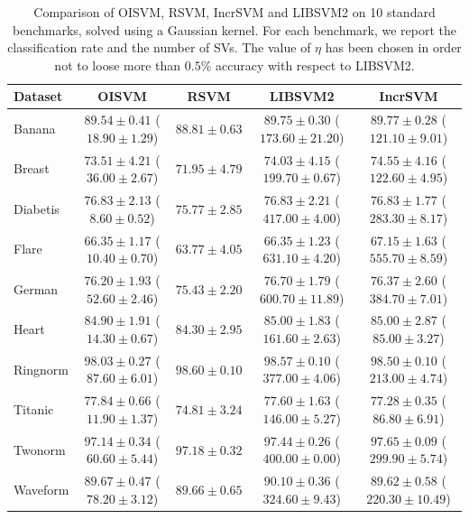 \begin{table}[t]
\tiny
\renewcommand{\arraystretch}{1.3}
\caption{Comparison of OISVM, RSVM, IncrSVM and LIBSVM2 on 10 standard benchmarks, solved
 using a Gaussian kernel. For each benchmark, we report the classification rate and
 the number of SVs. The value of $\eta$ has been chosen in order not to loose
 more than $0.5\%$ accuracy with respect to LIBSVM2.}
\label{table:t1}
\centering
\begin{tabular}[!h]{lcccc}
\hline
    Dataset   & OISVM                           & RSVM           & LIBSVM2                          & IncrSVM                            \\ \hline
     Banana   & $89.54\pm0.41$ ($18.90\pm1.29$) & $88.81\pm0.63$ & $89.75\pm0.30$ ($173.60\pm21.20$) & $89.77\pm0.28$ ($121.10\pm9.01$)  \\
     Breast   & $73.51\pm4.21$ ($36.00\pm2.67$) & $71.95\pm4.79$ & $74.03\pm4.15$ ($199.70\pm0.67$)  & $74.55\pm4.16$ ($122.60\pm4.95$)  \\
     Diabetis & $76.83\pm2.13$ ($8.60\pm0.52$)  & $75.77\pm2.85$ & $76.83\pm2.21$ ($417.00\pm4.00$)  & $76.83\pm1.77$ ($283.30\pm8.17$)  \\
     Flare    & $66.35\pm1.17$ ($10.40\pm0.70$) & $63.77\pm4.05$ & $66.35\pm1.23$ ($631.10\pm4.20$)  & $67.15\pm1.63$ ($555.70\pm8.59$)  \\
     German   & $76.20\pm1.93$ ($52.60\pm2.46$) & $75.43\pm2.20$ & $76.70\pm1.79$ ($600.70\pm11.89$) & $76.37\pm2.60$ ($384.70\pm7.01$)  \\
     Heart    & $84.90\pm1.91$ ($14.30\pm0.67$) & $84.30\pm2.95$ & $85.00\pm1.83$ ($161.60\pm2.63$)  & $85.00\pm2.87$ ($85.00\pm3.27$)   \\
     Ringnorm & $98.03\pm0.27$ ($87.60\pm6.01$) & $98.60\pm0.10$ & $98.57\pm0.10$ ($377.00\pm4.06$)  & $98.50\pm0.10$ ($213.00\pm4.74$)  \\
     Titanic  & $77.84\pm0.66$ ($11.90\pm1.37$) & $74.81\pm3.24$ & $77.60\pm1.63$ ($146.00\pm5.27$)  & $77.28\pm0.35$ ($86.80\pm6.91$)   \\
     Twonorm  & $97.14\pm0.34$ ($60.60\pm5.44$) & $97.18\pm0.32$ & $97.44\pm0.26$ ($400.00\pm0.00$)  & $97.65\pm0.09$ ($299.90\pm5.74$)  \\
     Waveform & $89.67\pm0.47$ ($78.20\pm3.12$) & $89.66\pm0.65$ & $90.10\pm0.36$ ($324.60\pm9.43$)  & $89.62\pm0.58$ ($220.30\pm10.49$) \\ \hline
\end{tabular}
\end{table}

